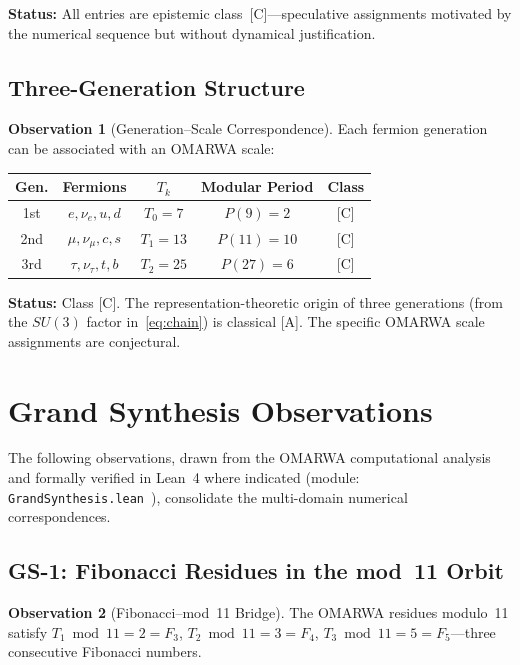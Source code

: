 \documentclass[11pt, a4paper]{article}
\theoremstyle{plain}
\theoremstyle{definition}
\newtheorem{observation}{Observation}[section]
\theoremstyle{remark}
\begin{document}
\textbf{Status:} All entries are epistemic class~[C]---speculative
assignments motivated by the numerical sequence but without
dynamical justification.

\subsection{Three-Generation Structure}

\begin{observation}[Generation--Scale Correspondence]
\label{obs:gen}
Each fermion generation can be associated with an OMARWA scale:

\smallskip
\begin{center}
\begin{tabular}{@{}ccccc@{}}
\toprule
Gen. & Fermions & $T_k$ & Modular Period & Class \\
\midrule
1st & $e, \nu_e, u, d$ & $T_0 = 7$ & $P(9) = 2$ & [C] \\
2nd & $\mu, \nu_\mu, c, s$ & $T_1 = 13$ & $P(11) = 10$ & [C] \\
3rd & $\tau, \nu_\tau, t, b$ & $T_2 = 25$ & $P(27) = 6$ & [C] \\
\bottomrule
\end{tabular}
\end{center}
\end{observation}

\textbf{Status:} Class [C]. The representation-theoretic origin of
three generations (from the $SU(3)$ factor in~\eqref{eq:chain}) is
classical [A]. The specific OMARWA scale assignments are conjectural.

\section{Grand Synthesis Observations}
\label{sec:gs}

The following observations, drawn from the OMARWA computational
analysis and formally verified in Lean~4 where indicated
(module: \texttt{GrandSynthesis.lean}~\cite{paket1}), consolidate
the multi-domain numerical correspondences.

\subsection{GS-1: Fibonacci Residues in the mod~11 Orbit}

\begin{observation}[Fibonacci--mod~11 Bridge]
\label{obs:gs1}
The OMARWA residues modulo~11 satisfy
$T_1 \bmod 11 = 2 = F_3$, $T_2 \bmod 11 = 3 = F_4$,
$T_3 \bmod 11 = 5 = F_5$---three consecutive Fibonacci numbers.
\end{observation}
\end{document}
